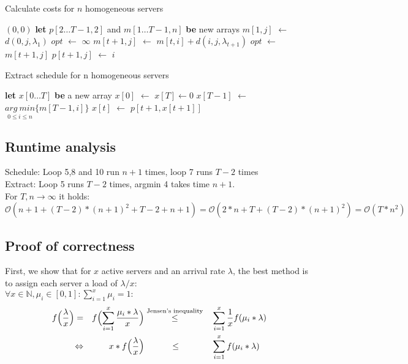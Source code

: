 \documentclass[hidelinks]{article}
\newcommand\Let[2]{\State #1 $\gets$ #2}
\newcommand\Blet[2]{\State \textbf{let} #1 \textbf{be} #2}
\theoremstyle{plain}
\theoremstyle{definition}
\theoremstyle{rem}
\begin{document}
\begin{sloppypar}
\begin{algorithm}[H]
    \caption{Calculate costs for $n$ homogeneous servers}
    \begin{algorithmic}[1]
		\State \Return $(0,0)$
	\EndIf
	\Blet{$p[2\ldots T-1,2]$ and $m[1\ldots T-1,n]$}{new arrays}
		\Let{$m[1,j]$}{$d(0,j,\lambda_1)$}
	\EndFor
			\Let{$opt$}{$\infty$}
				\Let{$m[t+1,j]$}{$m[t,i]+d(i,j,\lambda_{t+1})$}
					\Let{$opt$}{$m[t+1,j]$}
					\Let{$p[t+1,j]$}{$i$}
				\EndIf
			\EndFor
		\EndFor
	\EndFor
	\State \Return{$p$ and $m$}
  \EndFunction
  \end{algorithmic}
\end{algorithm}
\begin{algorithm}[H]
    \caption{Extract schedule for n homogeneous servers}
    \begin{algorithmic}[1]
	\Blet{$x[0\ldots T]$}{a new array}
	\Let{$x[0]$}{$x[T]\leftarrow 0$}
	\Let{$x[T-1]$}{$\underset{0\le i\le n}{arg\ min}\{m[T-1,i]\}$}
	\For{$t \gets T-2 \textrm{ to } 1$}
		\Let{$x[t]$}{$p[t+1,x[t+1]]$}
	\EndFor
	\State {}
  \EndFunction
  \end{algorithmic}
\end{algorithm}

\subsection{Runtime analysis}
Schedule: Loop 5,8 and 10 run $n+1$ times, loop 7 runs $T-2$ times\\
Extract: Loop 5 runs $T-2$ times, argmin 4 takes time $n+1$.\\
For $T,n\rightarrow\infty$ it holds:
\begin{equation}
	\mathcal{O}(n+1+(T-2)*(n+1)^2+T-2+n+1)=\mathcal{O}(2*n+T+(T-2)*(n+1)^2)=\mathcal{O}(T*n^2) 
\end{equation}

\subsection{Proof of correctness}
First, we show that for $x$ active servers and an arrival rate $\lambda$, the best method is to assign each server a load of $\lambda/x$:\\
$\forall x\in\mathbb{N},\mu_i\in[0,1]:\sum\limits_{i=1}^{x}{\mu_i}=1:$
\begin{alignat}{5}
	f\Bigl(\frac{\lambda}{x}\Bigr)=&&f\Bigl(\sum\limits_{i=1}^x{\frac{\mu_i*\lambda}{x}}\Bigr)&\stackrel{\text{Jensen's inequality}}{\le}&&\sum\limits_{i=1}^x\frac{1}{x}f(\mu_i*\lambda) \nonumber\\
	\Leftrightarrow &&x*f\Bigl(\frac{\lambda}{x}\Bigr)&\qquad\quad\le&&\sum\limits_{i=1}^xf(\mu_i*\lambda)
\end{alignat}


\end{sloppypar}
\end{document}
